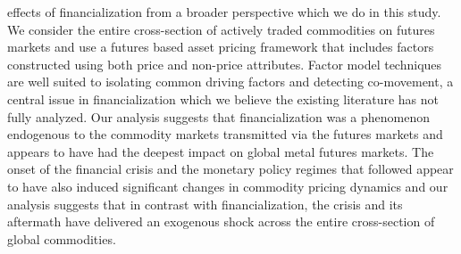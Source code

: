 \documentclass[12pt,]{article}
\begin{document}
effects of financialization from a broader perspective which we do in
this study. We consider the entire cross-section of actively traded
commodities on futures markets and use a futures based asset pricing
framework that includes factors constructed using both price and
non-price attributes. Factor model techniques are well suited to
isolating common driving factors and detecting co-movement, a central
issue in financialization which we believe the existing literature has
not fully analyzed. Our analysis suggests that financialization was a
phenomenon endogenous to the commodity markets transmitted via the
futures markets and appears to have had the deepest impact on global
metal futures markets. The onset of the financial crisis and the
monetary policy regimes that followed appear to have also induced
significant changes in commodity pricing dynamics and our analysis
suggests that in contrast with financialization, the crisis and its
aftermath have delivered an exogenous shock across the entire
cross-section of global commodities.

\newpage
\begingroup\fontsize{10}{12}\selectfont
\end{document}
